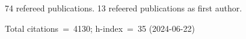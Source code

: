 74 refereed publications. 13 refeered publications as first author.

Total citations~=~4130; h-index~=~35 (2024-06-22)